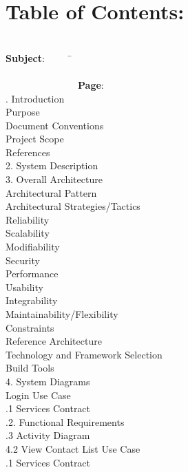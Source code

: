 \documentclass[29pt,a4paper]{moderncv}
\begin{document}
\newpage
\section{\textbf{Table of Contents:}}
\begin{tabbing}
\\\textbf{Subject}: ~~~~~\= ~~~~~~~~~~~~~~~~~~~~~~~~~~~~~~~~~~~~~~~~~~~~~~~~~~~~~~~~~~~~~~~~~~~~~~~~~~~~~~~~~~~~~~~\= \textbf{Page}:
\\. Introduction \> \\							
 Purpose 	\\							
 Document Conventions 					\\
 Project Scope 							\\
 References 							\\
2. System Description \> 					\\
3. Overall Architecture \> 				\\
 Architectural Pattern  				\\
 Architectural Strategies/Tactics  	\\
\> Reliability 							\\
\> Scalability 							\\
\> Modifiability 							\\
\> Security						\\
\> Performance 						\\
\> Usability 							\\
\> Integrability 						\\
\> Maintainability/Flexibility 		\\
\> Constraints 						\\
 Reference Architecture 			\\
 Technology and Framework Selection  		\\
 Build Tools 							\\
4. System Diagrams \> \\
 Login Use Case \\
.1 Services Contract \\
.2. Functional Requirements \\
.3 Activity Diagram \\
4.2 View Contact List Use Case \> \\
.1 Services Contract \\

\end{tabbing}
\end{document}
